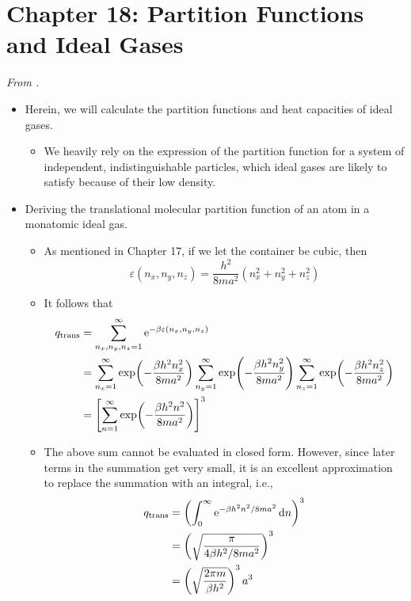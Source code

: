 \documentclass[../notes.tex]{subfiles}
\begin{document}
\section{Chapter 18: Partition Functions and Ideal Gases}
\emph{From \textcite{bib:McQuarrieSimon}.}
\begin{itemize}
    \item {}Herein, we will calculate the partition functions and heat capacities of ideal gases.
    \begin{itemize}
        \item We heavily rely on the expression of the partition function for a system of independent, indistinguishable particles, which ideal gases are likely to satisfy because of their low density.
    \end{itemize}
    \item Deriving the translational molecular partition function of an atom in a monatomic ideal gas.
    \begin{itemize}
        \item As mentioned in Chapter 17, if we let the container be cubic, then
        \begin{equation*}
            \varepsilon(n_x,n_y,n_z) = \frac{h^2}{8ma^2}(n_x^2+n_y^2+n_z^2)
        \end{equation*}
        \item It follows that
        \begin{align*}
            q_\text{trans} &= \sum_{n_x,n_y,n_z=1}^\infty\e[-\beta\varepsilon(n_x,n_y,n_z)]\\
            &= \sum_{n_x=1}^\infty\exp(-\frac{\beta h^2n_x^2}{8ma^2})\sum_{n_y=1}^\infty\exp(-\frac{\beta h^2n_y^2}{8ma^2})\sum_{n_z=1}^\infty\exp(-\frac{\beta h^2n_z^2}{8ma^2})\\
            &= \left[ \sum_{n=1}^\infty\exp(-\frac{\beta h^2n^2}{8ma^2}) \right]^3
        \end{align*}
        \item The above sum cannot be evaluated in closed form. However, since later terms in the summation get very small, it is an excellent approximation to replace the summation with an integral, i.e.,
        \begin{align*}
            q_\text{trans} &= \left( \int_0^\infty\e[-\beta h^2n^2/8ma^2]\dd{n} \right)^3\\
            &= \left( \sqrt{\frac{\pi}{4\beta h^2/8ma^2}} \right)^3\\
            &= \left( \sqrt{\frac{2\pi m}{\beta h^2}} \right)^3a^3\\

\end{align*}
\end{itemize}
\end{itemize}
\end{document}
